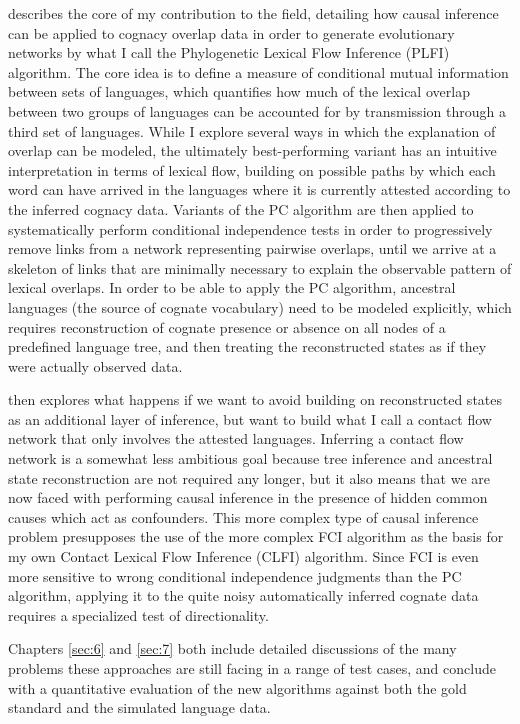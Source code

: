 \largerpage
{} describes the core of my contribution to the field, detailing how causal inference can be applied to cognacy overlap data in order to generate evolutionary networks by what I call the Phylogenetic Lexical Flow Inference (PLFI) algorithm. The core idea is to define a measure of conditional mutual information between sets of languages, which quantifies how much of the lexical overlap between two groups of languages can be accounted for by transmission through a third set of languages. While I explore several ways in which the explanation of overlap can be modeled, the ultimately best-performing variant has an intuitive interpretation in terms of lexical flow, building on possible paths by which each word can have arrived in the languages where it is currently attested according to the inferred cognacy data. Variants of the PC algorithm are then applied to systematically perform conditional independence tests in order to progressively remove links from a network representing pairwise overlaps, until we arrive at a skeleton of links that are minimally necessary to explain the observable pattern of lexical overlaps. In order to be able to apply the PC algorithm, ancestral languages (the source of cognate vocabulary) need to be modeled explicitly, which requires reconstruction of cognate presence or absence on all nodes of a predefined language tree, and then treating the reconstructed states as if they were actually observed data.

 then explores what happens if we want to avoid building on reconstructed states as an additional layer of inference, but want to build what I call a contact flow network that only involves the attested languages. Inferring a contact flow network is a somewhat less ambitious goal because tree inference and ancestral state reconstruction are not required any longer, but it also means that we are now faced with performing causal inference in the presence of hidden common causes which act as confounders. This more complex type of causal inference problem presupposes the use of the more complex FCI algorithm as the basis for my own Contact Lexical Flow Inference (CLFI) algorithm. Since FCI is even more sensitive to wrong conditional independence judgments than the PC algorithm, applying it to the quite noisy automatically inferred cognate data requires a specialized test of directionality.

Chapters \ref{sec:6} and \ref{sec:7} both include detailed discussions of the many problems these approaches are still facing in a range of test cases, and conclude with a quantitative evaluation of the new algorithms against both the gold standard and the simulated language data.

